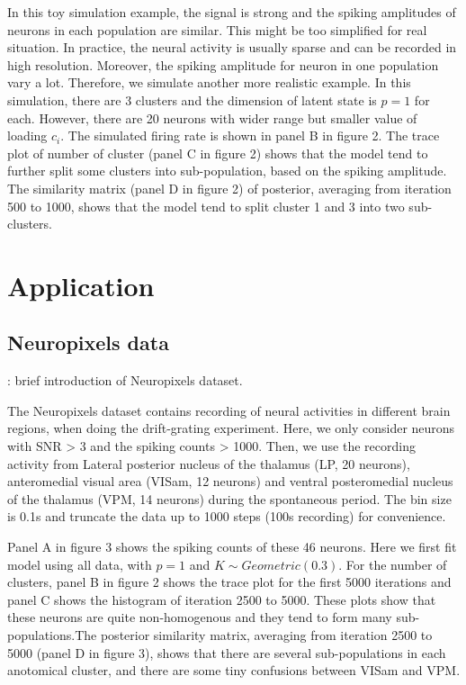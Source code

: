 \documentclass{article}
\begin{document}
	
	In this toy simulation example, the signal is strong and the spiking amplitudes of neurons in each population are similar. This might be too simplified for real situation. In practice, the neural activity is usually sparse and can be recorded in high resolution. Moreover, the spiking amplitude for neuron in one population vary a lot. Therefore, we simulate another more realistic example. In this simulation, there are 3 clusters and the dimension of latent state is $p=1$ for each. However, there are 20 neurons with wider range but smaller value of loading $c_i$. The simulated firing rate is shown in panel B in figure 2. The trace plot of number of cluster (panel C in figure 2) shows that the model tend to further split some clusters into sub-population, based on the spiking amplitude. The similarity matrix (panel D in figure 2) of posterior, averaging from iteration 500 to 1000, shows that the model tend to split cluster 1 and 3 into two sub-clusters.
	
	\section{Application}
	\label{app}
	
	\subsection{Neuropixels data}
	\answerTODO{}: brief introduction of Neuropixels dataset.
	
	The Neuropixels dataset contains recording of neural activities in different brain regions, when doing the drift-grating experiment. Here, we only consider neurons with SNR > 3 and the spiking counts > 1000. Then, we use the recording activity from Lateral posterior nucleus of the thalamus (LP, 20 neurons), anteromedial visual area (VISam, 12 neurons) and ventral posteromedial nucleus of the thalamus (VPM, 14 neurons) during the spontaneous period. The bin size is 0.1s and truncate the data up to 1000 steps (100s recording) for convenience. 
	
	Panel A in figure 3 shows the spiking counts of these 46 neurons. Here we first fit model using all data, with $p=1$ and $K\sim Geometric(0.3)$. For the number of clusters, panel B in figure 2 shows the trace plot for the first 5000 iterations and panel C shows the histogram of iteration 2500 to 5000. These plots show that these neurons are quite non-homogenous and they tend to form many sub-populations.The posterior similarity matrix, averaging from iteration 2500 to 5000 (panel D in figure 3), shows that there are several sub-populations in each anotomical cluster, and there are some tiny confusions between VISam and VPM.
	
\end{document}
